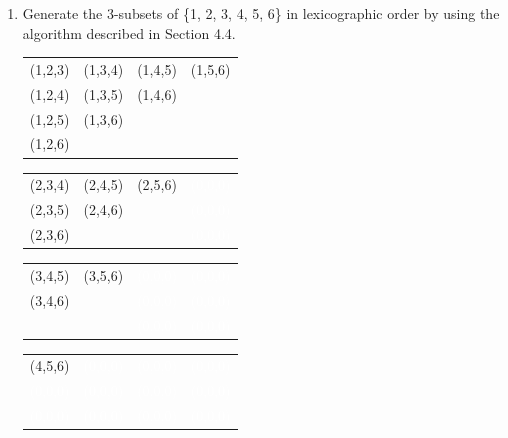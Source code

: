 \documentclass[12pt]{article}
\begin{document}


\begin{enumerate}
    \item[\bf 4.6.27] Generate the 3-subsets of \{1, 2, 3, 4, 5, 6\} in lexicographic order by using the algorithm described in Section 4.4.\\
    
    \begin{center}
        \begin{tabular}{cccc}
        (1,2,3) & (1,3,4) & (1,4,5) & (1,5,6) \\
        (1,2,4) & (1,3,5) & (1,4,6) &         \\
        (1,2,5) & (1,3,6) &         &         \\
        (1,2,6) &         &         &        
        \end{tabular}
    \end{center}
    
    \begin{center}
        \begin{tabular}{cccc}
        (2,3,4) & (2,4,5) & (2,5,6)&  \textcolor{white}{(0,0,0)}\\
        (2,3,5) & (2,4,6) &     &   \textcolor{white}{(0,0,0)}  \\
        (2,3,6) &         &      &  \textcolor{white}{(0,0,0)} 
        \end{tabular}
    \end{center}
    
    \begin{center}
        \begin{tabular}{cccc}
        (3,4,5)              & (3,5,6)              & \textcolor{white}{(0,0,0)} & \textcolor{white}{(0,0,0)} \\
        (3,4,6)              &                      & \textcolor{white}{(0,0,0)} & \textcolor{white}{(0,0,0)} \\
        \multicolumn{1}{l}{} & \multicolumn{1}{l}{} & \textcolor{white}{(0,0,0)} & \textcolor{white}{(0,0,0)}
        \end{tabular}
    \end{center}
    
    \begin{center}
        \begin{tabular}{cccc}
        (4,5,6) & \textcolor{white}{(0,0,0)} & \textcolor{white}{(0,0,0)} & \textcolor{white}{(0,0,0)} \\
        \textcolor{white}{(0,0,0)}     & \textcolor{white}{(0,0,0)} & \textcolor{white}{(0,0,0)} & \textcolor{white}{(0,0,0)} \\
        \textcolor{white}{(0,0,0)}     & \textcolor{white}{(0,0,0)} & \textcolor{white}{(0,0,0)} & \textcolor{white}{(0,0,0)}
        \end{tabular}
    \end{center}
    

\end{enumerate}
\end{document}
